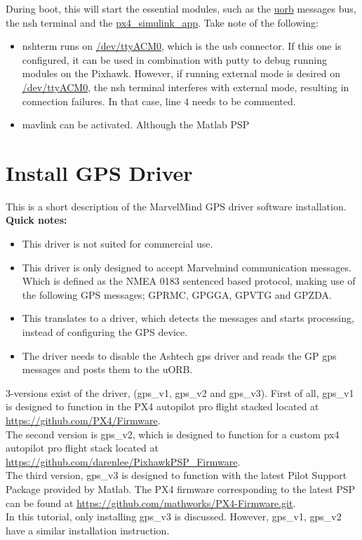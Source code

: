 During boot, this will start the essential modules, such as the \url{uorb} messages bus, the nsh terminal and the \url{px4_simulink_app}. Take note of the following:
\begin{itemize}
\item nshterm runs on \url{/dev/ttyACM0}, which is the usb connector. If this one is configured, it can be used in combination with putty to debug running modules on the Pixhawk. However, if running external mode is desired on \url{/dev/ttyACM0}, the nsh terminal interferes with external mode, resulting in connection failures. In that case, line 4 needs to be commented.
\item \color{red}mavlink can be activated. Although the Matlab PSP\color{black}
\end{itemize}
\section{Install GPS Driver}
This is a short description of the MarvelMind GPS driver software installation.\\
\newline
\textbf{Quick notes:}
\begin{itemize}
	\item This driver is not suited for commercial use.
	\item This driver is only designed to accept Marvelmind communication messages. Which is defined as the NMEA 0183 sentenced based protocol, making use of the following GPS messages; GPRMC, GPGGA, GPVTG and GPZDA.
	\item This translates to a driver, which detects the messages and starts processing, instead of configuring the GPS device.
	\item The driver needs to disable the Ashtech gps driver and reads the GP gps messages and posts them to the uORB.
\end{itemize}
3-versions exist of the driver, (gps\_v1, gps\_v2 and gps\_v3). First of all, gps\_v1 is designed to function in the PX4 autopilot pro flight stacked located at \url{https://github.com/PX4/Firmware}.\\ 
\newline
The second version is gps\_v2, which is designed to function for a custom px4 autopilot pro flight stack located at \url{https://github.com/darenlee/PixhawkPSP\_Firmware}.\\
\newline
The third version, gps\_v3 is designed to function with the latest Pilot Support Package provided by Matlab. The PX4 firmware corresponding to the latest PSP can be found at \url{https://github.com/mathworks/PX4-Firmware.git}.\\
\newline
In this tutorial, only installing gps\_v3 is discussed. However, gps\_v1, gps\_v2 have a similar installation instruction.
